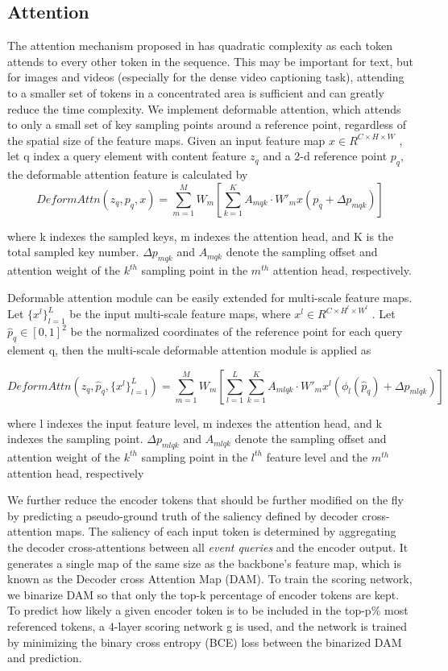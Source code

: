 \subsection{Attention}
\par The attention mechanism proposed in \cite{tfm} has quadratic complexity as each token attends to every other token in the sequence. This may be important for text, but for images and videos (especially for the dense video captioning task), attending to a smaller set of tokens in a concentrated area is sufficient and can greatly reduce the time complexity. 
We implement deformable attention, which attends to only a small set of key sampling points around a reference point, regardless of the spatial
size of the feature maps. Given an input feature map $x \in R^{C\times H \times W}$ , let q index a query element with content feature $z_q$ and a 2-d reference point $p_q$, the deformable attention feature is calculated by
$$ DeformAttn(z_q, p_q, x) = \displaystyle\sum\limits_{m=1}^M W_m
[\displaystyle\sum\limits_{k=1}^K A_{mqk}\cdot W'_mx(p_q+\Delta p_{mqk})]
$$
\par where k indexes the sampled keys, m indexes the attention head, and K is the total sampled key number. $\Delta p_{mqk}$ and $A_{mqk}$ denote the sampling offset and attention weight of the $k^{th}$ sampling point in the $m^{th}$ attention head, respectively.
\par Deformable attention module can be easily extended for multi-scale feature maps. Let $\{{x^l}\}_{l=1}^L$ be the input multi-scale feature maps, where  $x^l \in R^{C\times H^l \times W^l}$ . Let $ \hat p_q \in [0, 1]^2$ be the normalized coordinates of the reference point for each query element q, then the multi-scale deformable attention module is applied as

$$DeformAttn(z_q, \hat{p}_q, \{{x^l}\}_{l=1}^L) = 
\displaystyle\sum\limits_{m=1}^M W_m
[\displaystyle\sum\limits_{l=1}^L\displaystyle\sum\limits_{k=1}^K A_{mlqk}\cdot W'_mx^l(\phi _l (\hat p_q)+\Delta p_{mlqk})]$$

\par where l indexes the input feature level, m indexes the attention head, and k indexes the sampling point. $\Delta p_{mlqk}$ and $A_{mlqk}$ denote the sampling offset and attention weight of the $k^{th}$ sampling point in the $l^{th}$ feature level and the $m^{th}$ attention head, respectively

\par We further reduce the encoder tokens that should be further modified on the fly by
predicting a pseudo-ground truth of the saliency defined by decoder cross-attention maps.
The saliency of each input token is determined by aggregating the decoder cross-attentions between all \textit{event queries} and the encoder output. It generates a single map of the same size as the backbone’s feature map, which is known as the Decoder cross Attention Map (DAM). To train the scoring network, we binarize DAM so that only the top-k percentage of encoder tokens are
kept. To predict how likely a given encoder token is to be included in the top-p\% most referenced tokens, a 4-layer scoring network g is used, and the network is trained by minimizing the binary cross entropy (BCE) loss between the binarized DAM and prediction.


